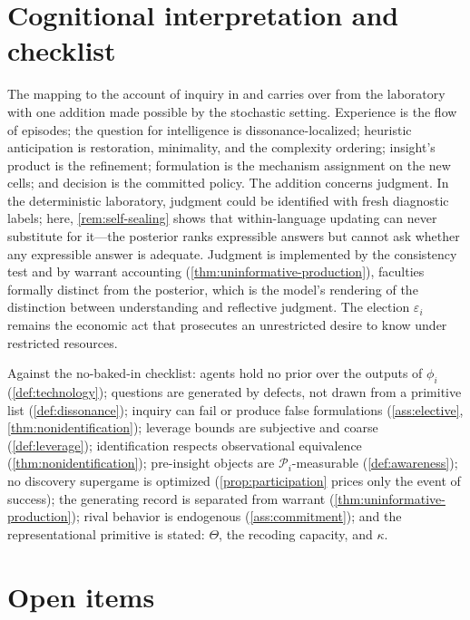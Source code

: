 \documentclass[11pt]{article}
\begin{document}
\section{Cognitional interpretation and checklist}
\label{sec:cognitional}

The mapping to the account of inquiry in \citet{Lonergan1992} and
\citet{RyallWilkins2018} carries over from the laboratory with one addition
made possible by the stochastic setting.  Experience is the flow of episodes;
the question for intelligence is dissonance-localized; heuristic anticipation
is restoration, minimality, and the complexity ordering; insight's product is
the refinement; formulation is the mechanism assignment on the new cells; and
decision is the committed policy.  The addition concerns judgment.  In the
deterministic laboratory, judgment could be identified with fresh diagnostic
labels; here, \cref{rem:self-sealing} shows that within-language updating can
never substitute for it---the posterior ranks expressible answers but cannot
ask whether any expressible answer is adequate.  Judgment is implemented by
the consistency test and by warrant accounting
(\cref{thm:uninformative-production}), faculties formally distinct from the
posterior, which is the model's rendering of the distinction between
understanding and reflective judgment.  The election $\varepsilon_i$ remains
the economic act that prosecutes an unrestricted desire to know under
restricted resources.

Against the no-baked-in checklist: agents hold no prior over the outputs of
$\phi_i$ (\cref{def:technology}); questions are generated by defects, not
drawn from a primitive list (\cref{def:dissonance}); inquiry can fail or
produce false formulations (\cref{ass:elective},
\cref{thm:nonidentification}); leverage bounds are subjective and coarse
(\cref{def:leverage}); identification respects observational equivalence
(\cref{thm:nonidentification}); pre-insight objects are
$\mathcal P_i$-measurable (\cref{def:awareness}); no discovery supergame is
optimized (\cref{prop:participation} prices only the event of success); the
generating record is separated from warrant
(\cref{thm:uninformative-production}); rival behavior is endogenous
(\cref{ass:commitment}); and the representational primitive is stated:
$\Theta$, the recoding capacity, and $\kappa$.

\section{Open items}
\label{sec:open}
\end{document}
